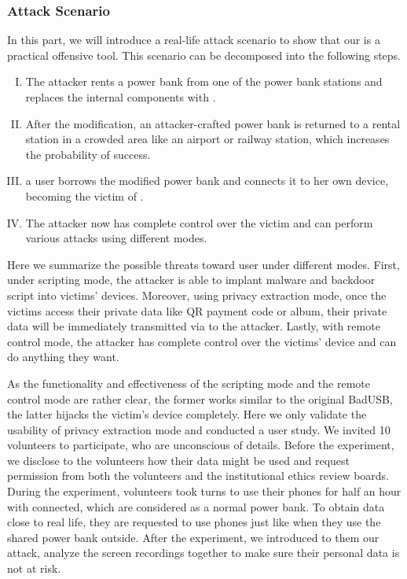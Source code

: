 \subsubsection{Attack Scenario}

In this part, we will introduce a real-life attack scenario to show that our
\tool is a practical offensive tool.  This scenario can be decomposed into the
following steps.

\begin{enumerate}[I. ]
	\item The attacker rents a power bank from one of the power bank stations and replaces the internal components with \tool.
	\item After the modification, an attacker-crafted power bank is returned to a rental station in a crowded area like an airport or railway station, which increases the probability of success.
	\item a user borrows the modified power bank and connects it to her own device, becoming the victim of \tool.
	\item The attacker now has complete control over the victim and can perform various attacks using different modes.
\end{enumerate}

Here we summarize the possible threats toward user under different modes. 
First, under scripting mode, the attacker is able to implant malware and backdoor script into victims' devices. Moreover, using privacy extraction mode, once the victims access their private data like QR payment  code or album, their private data will be immediately transmitted via \tool to the attacker. Lastly, with remote control mode, the attacker has complete control over the victims' device and can do anything they want.

As the functionality and effectiveness of the scripting mode and the remote control mode are rather clear, the former works similar to the original BadUSB, the latter hijacks the victim's device completely.
Here we only validate the usability of privacy extraction mode and conducted a user study.
We invited 10 volunteers to participate, who are unconscious of \tool details.
Before the experiment, we disclose to the volunteers how their data might be used and request permission from both the volunteers and the institutional ethics review boards.
During the experiment, volunteers took turns to use their phones for half an hour with \tool connected, which are considered as a normal power bank.
To obtain data close to real life, they are requested to use phones just like when they use the shared power bank outside.
After the experiment, we introduced to them our attack, analyze the screen recordings together to make sure their personal data is not at risk.


